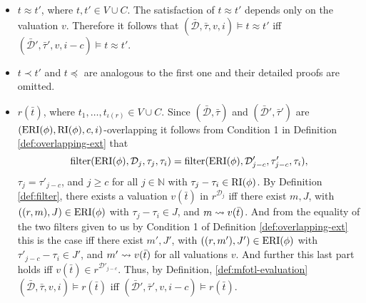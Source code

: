 \begin{itemize}
    \item 
        $t \approx t'$, where $t, t' \in V \cup C$. 
        The satisfaction of $t \approx t'$ depends only on the valuation $v$.
        Therefore it follows that $(\bar{\mathcal{D}},\bar{\tau},v,i) \models t \approx t'$ iff $(\bar{\mathcal{D}}',\bar{\tau}',v,i-c) \models t \approx t'$.
    \item 
        $t \prec t'$ and $t \preceq$ are analogous to the first one and their detailed proofs are omitted.
    \item 
        $r(\bar{t})$, where $t_1, \dots, t_{\iota(r)} \in V \cup C$. 
        Since $(\bar{\mathcal{D}},\bar{\tau})$ and $(\bar{\mathcal{D}}',\bar{\tau}')$ are $(\operatorname{ERI}(\phi), \operatorname{RI}(\phi), c, i)$-overlapping it follows from Condition 1 in Definition \ref{def:overlapping-ext} that 
        \begin{equation*}
            \operatorname{filter}(\operatorname{ERI}(\phi), \mathcal{D}_j, \tau_j, \tau_i)
            = \operatorname{filter}(\operatorname{ERI}(\phi), \mathcal{D}'_{j-c}, \tau'_{j-c}, \tau_i),
        \end{equation*}
        $\tau_j = \tau'_{j-c}$, and $j \geq c$
        for all $j \in \mathbb{N}$ with $\tau_j - \tau_i \in \operatorname{RI}(\phi)$.
                By Definition \ref{def:filter}, there exists a valuation $v(\bar{t})$ in $r^{\mathcal{D}_j}$ iff there exist $m,J$, with $((r,m),J) \in \operatorname{ERI}(\phi)$ with $\tau_j - \tau_i \in J$, and $m \rightsquigarrow v(\bar{t})$.
                And from the equality of the two filters given to us by Condition 1 of Definition \ref{def:overlapping-ext} this is the case iff there exist $m', J'$, with $((r,m'),J') \in \operatorname{ERI}(\phi)$ with $\tau'_{j-c} - \tau_i \in J'$, and $m' \rightsquigarrow v(\bar{t})$ for all valuations $v$.
                And further this last part holds iff $v(\bar{t}) \in r^{\mathcal{D}'_{j-c}}$.
                Thus, by Definition, \ref{def:mfotl-evaluation}
                    $(\bar{\mathcal{D}},\bar{\tau},v,i) \models r(\bar{t})$
                    iff
                    $(\bar{\mathcal{D}}',\bar{\tau}',v,i-c) \models r(\bar{t})$.


\end{itemize}
